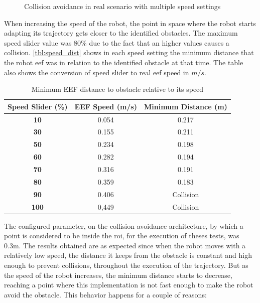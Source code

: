 \begin{figure}[h]
\begin{subfigure}{.5\linewidth}
    \end{subfigure}
    \caption{Collision avoidance in real scenario with multiple speed settings}
    \label{fig:real_col_speed}
\end{figure}

\par When increasing the speed of the robot, the point in space where the robot starts adapting its trajectory gets closer to the identified obstacles. The maximum speed slider value was 80\% due to the fact that an higher values causes a collision. \autoref{tbl:speed_dist} shows in each speed setting the minimum distance that the robot \ac{eef} was in relation to the identified obstacle at that time. The table also shows the conversion of speed slider to real \ac{eef} speed in $m/s$.

\begin{table}[h]
    \centering
    \begin{tabular}{|c|c|c|}
    \hline
    \textbf{Speed Slider} (\%) & \textbf{EEF Speed} (m/s) & \textbf{Minimum Distance} (m) \\ \hline
    \textbf{10}          & 0.054              & 0.217                     \\ \hline
    \textbf{30}          & 0.155              & 0.211                     \\ \hline
    \textbf{50}          & 0.234              & 0.198                     \\ \hline
    \textbf{60}          & 0.282              & 0.194                     \\ \hline
    \textbf{70}          & 0.316              & 0.191                     \\ \hline
    \textbf{80}          & 0.359              & 0.183                     \\ \hline
    \textbf{90}          & 0.406              & Collision                 \\ \hline
    \textbf{100}          & 0,449              & Collision                 \\ \hline
    \end{tabular}
    \caption{Minimum EEF distance to obstacle relative to its speed}
    \label{tbl:speed_dist}
\end{table}

\par The configured parameter, on the collision avoidance architecture, by which a point is considered to be inside the \ac{roi}, for the execution of theses tests, was 0.3m. The results obtained are as expected since when the robot moves with a relatively low speed, the distance it keeps from the obstacle is constant and high enough to prevent collisions, throughout the execution of the trajectory. But as the speed of the robot increases, the minimum distance starts to decrease, reaching a point where this implementation is not fast enough to make the robot avoid the obstacle. This behavior happens for a couple of reasons:

